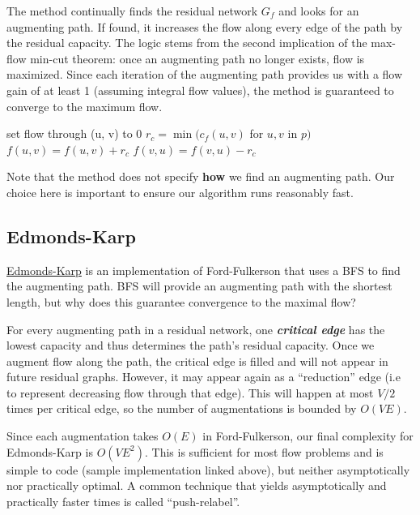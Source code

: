 \documentclass[11pt, oneside]{article}
\newcommand{\smallemphasis}[1]{\textbf{\textit{#1}}}
\begin{document}
The method continually finds the residual network \( G_f \) and looks for an augmenting path. If found, it increases the flow along every edge of the path by the residual capacity. The logic stems from the second implication of the max-flow min-cut theorem: once an augmenting path no longer exists, flow is maximized. Since each iteration of the augmenting path provides us with a flow gain of at least 1 (assuming integral flow values), the method is guaranteed to converge to the maximum flow.

\begin{algorithm}
  \begin{algorithmic}[h!]
          \State set flow through (u, v) to 0
      \EndFor
         \State $r_c = \min(c_f(u, v)$ for $u, v$ in $p)$
            \State $f(u, v) = f(u, v) + r_c$
            \State $f(v, u) = f(v, u) - r_c$
         \EndFor
      \EndWhile
    \EndProcedure
  \end{algorithmic}
\end{algorithm}

Note that the method does not specify \textbf{how} we find an augmenting path. Our choice here is important to ensure our algorithm runs reasonably fast.
\subsection{Edmonds-Karp}

\href{https://gist.github.com/stephen-huan/d660e04476f06695663401d0ac01a27a#flow}{Edmonds-Karp} is an implementation of Ford-Fulkerson that uses a BFS to find the augmenting path. BFS will provide an augmenting path with the shortest length, but why does this guarantee convergence to the maximal flow?

For every augmenting path in a residual network, one \smallemphasis{critical edge} has the lowest capacity and thus determines the path's residual capacity. Once we augment flow along the path, the critical edge is filled and will not appear in future residual graphs. However, it may appear again as a ``reduction'' edge (i.e to represent decreasing flow through that edge). This will happen at most \( V/2 \) times per critical edge, so the number of augmentations is bounded by \( O(VE) \).

Since each augmentation takes \( O(E) \) in Ford-Fulkerson, our final complexity for Edmonds-Karp is \( O(VE^2)\). This is sufficient for most flow problems and is simple to code (sample implementation linked above), but neither asymptotically nor practically optimal. A common technique that yields asymptotically and practically faster times is called ``push-relabel''.
\end{document}
